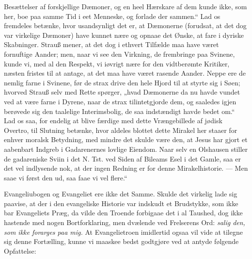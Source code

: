\documentclass[12pt,a4paper]{book}
\begin{document}
Besættelser af forskjellige Dæmoner, og en heel Hærskare af dem kunde ikke, som her, boe
paa samme Tid i eet Menneske, og forlade der sammen.“ Lad os fremdeles betænke, hvor
usandsynligt det er, at Dæmonerne (forudsat, at det dog var virkelige Dæmoner) have kunnet
nære og opnaae det Ønske, at fare i dyriske Skabninger. Strauß mener, at det dog i ethvert
Tilfælde maa have været fornuftige Aander; men, naar vi see den Virkning, de frembringe
paa Svinene, kunde vi, med al den Respekt, vi iøvrigt nære for den vidtberømte Kritiker,
næsten fristes til at antage, at det maa have været rasende Aander. Neppe ere de nemlig
farne i Svinene, før de strax drive den hele Hjord til at styrte sig i Søen; hvorved
Strauß selv med Rette spørger, „hvad Dæmonerne da nu havde vundet ved at være farne i
Dyrene, naar de strax tilintetgjorde dem, og saaledes igjen berøvede sig den taalelige
Interimsbolig, de saa indstændigt havde bedet om.“ Lad os saa, for endelig at blive
færdige med dette Vrængebillede af jødisk Overtro, til Slutning betænke, hvor aldeles
blottet dette Mirakel her staaer for enhver moralsk Betydning, med mindre det skulde være
den, at Jesus har gjort et aabenbart Indgreb i Gadarenernes lovlige Eiendom. Naar selv en
Olshausen stiller de gadareniske Sviin i det N. Tst. ved Siden af Bileams Esel i det
Gamle, saa er det vel indlysende nok, at der ingen Redning er for denne Mirakelhistorie.
--- Men saae vi først den ud, saa faae vi vel flere.“

Evangeliubogen og Evangeliet ere ikke det Samme. Skulde det virkelig lade sig paavise, at
der i den evangeliske Historie var indskudt et Brudstykke, som ikke bar Evangeliets Præg,
da vilde
den Troende forbigaae det i al Taushed, dog ikke hastende med nogen Bortforklaring, men
dvælende ved Frelserens Ord: \emph{salig den, som ikke forarges paa mig.} At
Evangelietroen imidlertid ogsaa vil vide at tilegne sig denne Fortælling, kunne vi maaskee
bedst godtgjøre ved at antyde følgende Opfattelse:
\end{document}
